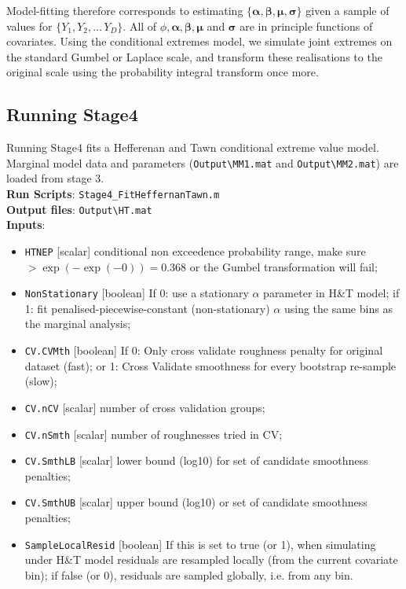 Model-fitting therefore corresponds to estimating $\{\boldsymbol{\alpha},\boldsymbol{\beta}, \boldsymbol{\mu}, \boldsymbol{\sigma}\}$ given a sample of values for $\{Y_1, Y_2,\dots\,Y_{D}\}$. All of $\phi, \boldsymbol{\alpha}, \boldsymbol{\beta}, \boldsymbol{\mu}$ and $\boldsymbol{\sigma}$ are in principle functions of covariates. Using the conditional extremes model, we simulate joint extremes on the standard Gumbel or Laplace scale, and transform these realisations to the original scale using the probability integral transform once more. 

\subsection{Running Stage4}

Running Stage4 fits a Hefferenan and Tawn conditional extreme value model. Marginal model data and parameters (\verb|Output\MM1.mat| and \verb|Output\MM2.mat|) are loaded from stage 3.\\

\textbf{Run Scripts}: \verb|Stage4_FitHeffernanTawn.m|\\
\textbf{Output files}: \verb|Output\HT.mat|\\
\textbf{Inputs}: \\
\begin{itemize}	
	\item \verb|HTNEP| [scalar] conditional non exceedence probability range, make sure $>\exp(-\exp(-0))=0.368$ or the Gumbel transformation will fail;
	\item \verb|NonStationary| [boolean] If 0: use a stationary $\alpha$ parameter in H\&T model; if 1: fit penalised-piecewise-constant (non-stationary) $\alpha$ using the same bins as the marginal analysis;
	\item \verb|CV.CVMth| [boolean] If 0: Only cross validate roughness penalty for original dataset (fast); or 1: Cross Validate smoothness for every bootstrap re-sample (slow);
	 \item \verb|CV.nCV| [scalar] number of cross validation groups;
 	\item \verb|CV.nSmth| [scalar] number of roughnesses tried in CV;
 	\item \verb|CV.SmthLB| [scalar] lower bound (log10) for set of candidate smoothness penalties;
 	\item \verb|CV.SmthUB|  [scalar] upper bound (log10) or set of candidate smoothness penalties;
 	\item \verb|SampleLocalResid| [boolean] If this is set to true (or 1), when simulating under H\&T model residuals are resampled locally (from the current covariate bin); if false (or 0), residuals are sampled globally, i.e. from any bin. 
\end{itemize}

